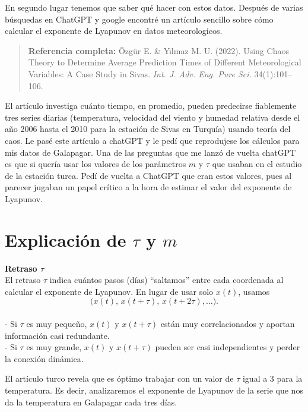 \documentclass[
  10pt,
  a4paper,
  DIV=11,
  numbers=noendperiod,
  open=any]{scrreprt}
\numberwithin{equation}{chapter}
\numberwithin{equation}{chapter}
\renewcommand{\[}{\begin{equation}}
\renewcommand{\]}{\end{equation}}
\begin{document}
En segundo lugar tenemos que saber qué hacer con estos datos. Después de
varias búsquedas en ChatGPT y google encontré un artículo sencillo sobre
cómo calcular el exponente de Lyapunov en datos meteorologicos.

\begin{quote}
\textbf{Referencia completa:} Özgür E. \& Yılmaz M. U. (2022). Using
Chaos Theory to Determine Average Prediction Times of Different
Meteorological Variables: A Case Study in Sivas. \emph{Int. J. Adv. Eng.
Pure Sci.} 34(1):101--106.
\end{quote}

El artículo investiga cuánto tiempo, en promedio, pueden predecirse
fiablemente tres series diarias (temperatura, velocidad del viento y
humedad relativa desde el año 2006 hasta el 2010 para la estación de
Sivas en Turquía) usando teoría del caos. Le pasé este artículo a
chatGPT y le pedí que reprodujese los cálculos para mis datos de
Galapagar. Una de las preguntas que me lanzó de vuelta chatGPT es que si
quería usar los valores de los parámetros \(m\) y \(\tau\) que usaban en
el estudio de la estación turca. Pedí de vuelta a ChatGPT que eran estos
valores, pues al parecer jugaban un papel crítico a la hora de estimar
el valor del exponente de Lyapunov.

\section{\texorpdfstring{Explicación de \(\tau\) y
\(m\)}{Explicación de \textbackslash tau y m}}\label{explicaciuxf3n-de-tau-y-m}

\textbf{Retraso \(\tau\)}\\
El retraso \(\tau\) indica cuántos pasos (días) ``saltamos'' entre cada
coordenada al calcular el exponente de Lyapunov. En lugar de usar solo
\(x(t)\), usamos\\
\[
\bigl(x(t),\,x(t+\tau),\,x(t+2\tau),\dots\bigr).
\]\\
- Si \(\tau\) es muy pequeño, \(x(t)\) y \(x(t+\tau)\) están muy
correlacionados y aportan información casi redundante.\\
- Si \(\tau\) es muy grande, \(x(t)\) y \(x(t+\tau)\) pueden ser casi
independientes y perder la conexión dinámica.

El artículo turco revela que es óptimo trabajar con un valor de \(\tau\)
igual a 3 para la temperatura. Es decir, analizaremos el exponente de
Lyapunov de la serie que nos da la temperatura en Galapagar cada tres
días.
\end{document}

